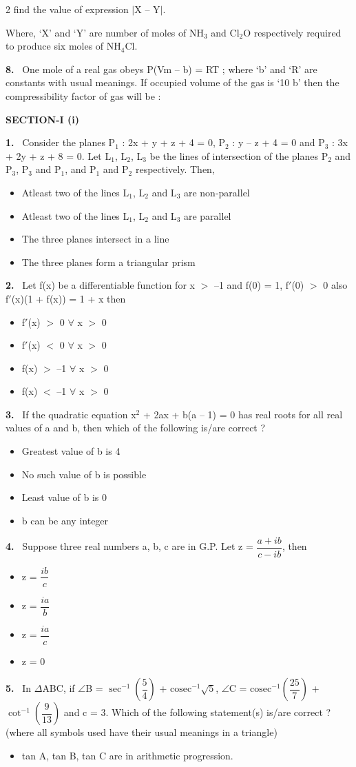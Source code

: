 \documentclass[10pt]{extarticle}
\newcommand{\partsec}[2]{\par\medskip\noindent{\large\bfseries PART-#1: #2}\par\smallskip}
\newcommand{\sect}[1]{\par\smallskip\noindent\textbf{#1}\par}
\newcommand{\qn}[1]{\par\smallskip\noindent\textbf{#1.}~}
\newenvironment{qoptions}{\begin{itemize}[leftmargin=1.8em,itemsep=1pt,topsep=2pt,label={}]}{\end{itemize}}
\newcommand{\opt}[2]{\item[(#1)] #2}
\begin{document}
\begin{multicols}{2}
find the value of expression $|$X -- Y$|$.\par
Where, `X' and `Y' are number of moles of NH$_3$ and Cl$_2$O respectively required to produce six moles of NH$_4$Cl.
\qn{8} One mole of a real gas obeys P(Vm -- b) = RT ; where `b' and `R' are constants with usual meanings. If occupied volume of the gas is `10 b' then the compressibility factor of gas will be :
\partsec{3}{MATHEMATICS}
\sect{SECTION-I (i)}
\qn{1} Consider the planes P$_1$ : 2x + y + z + 4 = 0, P$_2$ : y -- z + 4 = 0 and P$_3$ : 3x + 2y + z + 8 = 0. Let L$_1$, L$_2$, L$_3$ be the lines of intersection of the planes P$_2$ and P$_3$, P$_3$ and P$_1$, and P$_1$ and P$_2$ respectively. Then,
\begin{qoptions}
\opt{A}{Atleast two of the lines L$_1$, L$_2$ and L$_3$ are non-parallel}
\opt{B}{Atleast two of the lines L$_1$, L$_2$ and L$_3$ are parallel}
\opt{C}{The three planes intersect in a line}
\opt{D}{The three planes form a triangular prism}
\end{qoptions}
\qn{2} Let f(x) be a differentiable function for x $>$ --1 and f(0) = 1, f$'$(0) $>$ 0 also f$'$(x)(1 + f(x)) = 1 + x then
\begin{qoptions}
\opt{A}{f$'$(x) $>$ 0 $\forall$ x $>$ 0}
\opt{B}{f$'$(x) $<$ 0 $\forall$ x $>$ 0}
\opt{C}{f(x) $>$ --1 $\forall$ x $>$ 0}
\opt{D}{f(x) $<$ --1 $\forall$ x $>$ 0}
\end{qoptions}
\qn{3} If the quadratic equation x$^2$ + 2ax + b(a -- 1) = 0 has real roots for all real values of a and b, then which of the following is/are correct ?
\begin{qoptions}
\opt{A}{Greatest value of b is 4}
\opt{B}{No such value of b is possible}
\opt{C}{Least value of b is 0}
\opt{D}{b can be any integer}
\end{qoptions}
\qn{4} Suppose three real numbers a, b, c are in G.P. Let z = $\dfrac{a+ib}{c-ib}$, then
\begin{qoptions}
\opt{A}{z = $\dfrac{ib}{c}$}
\opt{B}{z = $\dfrac{ia}{b}$}
\opt{C}{z = $\dfrac{ia}{c}$}
\opt{D}{z = 0}
\end{qoptions}
\qn{5} In $\Delta$ABC, if $\angle$B = $\sec^{-1}\left(\dfrac{5}{4}\right)$ + $\text{cosec}^{-1}\sqrt{5}$, $\angle$C = $\text{cosec}^{-1}\left(\dfrac{25}{7}\right)$ + $\cot^{-1}\left(\dfrac{9}{13}\right)$ and c = 3. Which of the following statement(s) is/are correct ? (where all symbols used have their usual meanings in a triangle)
\begin{qoptions}
\opt{A}{tan A, tan B, tan C are in arithmetic progression.}

\end{qoptions}
\end{multicols}
\end{document}
